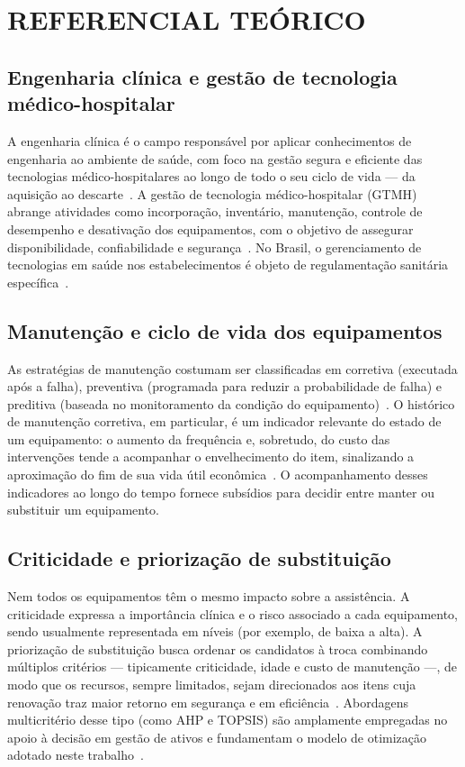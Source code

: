 \chapter{REFERENCIAL TEÓRICO}
\label{chap:refteorico}

\section{Engenharia clínica e gestão de tecnologia médico-hospitalar}

A engenharia clínica é o campo responsável por aplicar conhecimentos de
engenharia ao ambiente de saúde, com foco na gestão segura e eficiente das
tecnologias médico-hospitalares ao longo de todo o seu ciclo de vida --- da
aquisição ao descarte~\cite{zamzam2021prioritisation}. A gestão de tecnologia
médico-hospitalar (GTMH) abrange atividades como incorporação, inventário,
manutenção, controle de desempenho e desativação dos equipamentos, com o objetivo
de assegurar disponibilidade, confiabilidade e
segurança~\cite{park2025evaluation}. No Brasil, o gerenciamento de tecnologias em
saúde nos estabelecimentos é objeto de regulamentação sanitária
específica~\cite{toscas2023management}.

\section{Manutenção e ciclo de vida dos equipamentos}

As estratégias de manutenção costumam ser classificadas em corretiva (executada
após a falha), preventiva (programada para reduzir a probabilidade de falha) e
preditiva (baseada no monitoramento da condição do
equipamento)~\cite{zamzam2021prioritisation}. O histórico de
manutenção corretiva, em particular, é um indicador relevante do estado de um
equipamento: o aumento da frequência e, sobretudo, do custo das intervenções
tende a acompanhar o envelhecimento do item, sinalizando a aproximação do fim de
sua vida útil econômica~\cite{park2025evaluation}. O acompanhamento desses
indicadores ao longo do tempo fornece subsídios para decidir entre manter ou
substituir um equipamento.

\section{Criticidade e priorização de substituição}

Nem todos os equipamentos têm o mesmo impacto sobre a assistência. A criticidade
expressa a importância clínica e o risco associado a cada equipamento, sendo
usualmente representada em níveis (por exemplo, de baixa a alta). A priorização
de substituição busca ordenar os candidatos à troca combinando múltiplos
critérios --- tipicamente criticidade, idade e custo de manutenção ---, de modo
que os recursos, sempre limitados, sejam direcionados aos itens cuja renovação
traz maior retorno em segurança e em
eficiência~\cite{park2025evaluation,zamzam2021prioritisation}. Abordagens
multicritério desse tipo (como AHP e TOPSIS) são amplamente empregadas no apoio à
decisão em gestão de ativos e fundamentam o modelo de otimização adotado neste
trabalho~\cite{huang2024transforming}.

